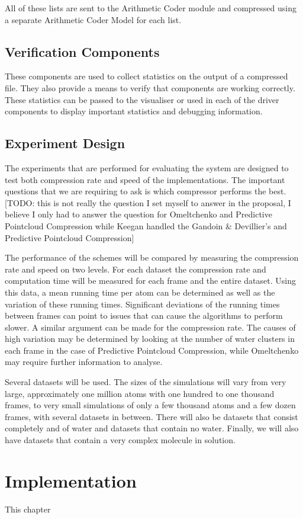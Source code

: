 \documentclass[a4paper,11pt]{report}
\begin{document}
All of these lists are sent to the Arithmetic Coder module and compressed using a separate Arithmetic Coder Model for each list. 

\section{Verification Components}
 
These components are used to collect statistics on the output of a compressed file. They also provide a means to verify that components are working correctly. These statistics can be passed to the visualiser or used in each of the driver components to display important statistics and debugging information. 


\section{Experiment Design}

The experiments that are performed for evaluating the system are designed to test both compression rate and speed of the implementations. The important questions that we are requiring to ask is which compressor performs the best. [TODO: this is not really the question I set myself to answer in the proposal, I believe I only had to answer the question for Omeltchenko and Predictive Pointcloud Compression while Keegan handled the Gandoin \& Devillier's and Predictive Pointcloud Compression]

The performance of the schemes will be compared by measuring the compression rate and speed on two levels. For each dataset the compression rate and computation time will be measured for each frame and the entire dataset. Using this data, a mean running time per atom can be determined as well as the variation of these running times. Significant deviations of the running times between frames can point to issues that can cause the algorithms to perform slower. A similar argument can be made for the compression rate. The causes of high variation may be determined by looking at the number of water clusters in each frame in the case of Predictive Pointcloud Compression, while Omeltchenko may require further information to analyse.

Several datasets will be used. The sizes of the simulations will vary from very large, approximately one million atoms with one hundred to one thousand frames, to very small simulations of only a few thousand atoms and a few dozen frames, with several datasets in between. There will also be datasets that consist completely and of water and datasets that contain no water. Finally, we will also have datasets that contain a very complex molecule in solution.

\chapter{Implementation}

This chapter 


\end{document}
